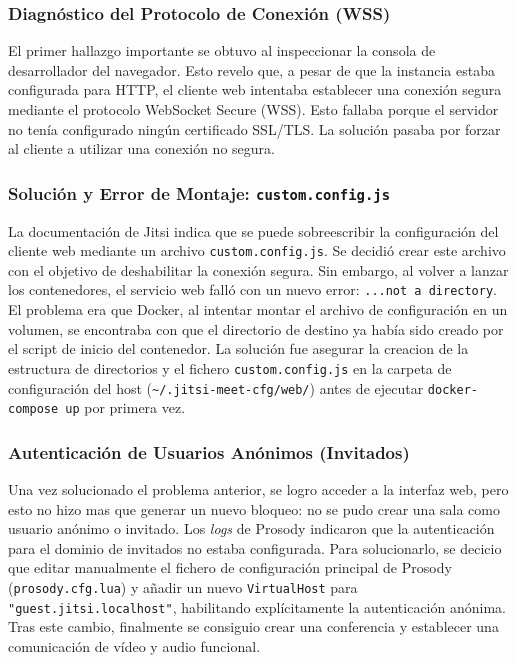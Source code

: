 \subsubsection{Diagnóstico del Protocolo de Conexión (WSS)}
El primer hallazgo importante se obtuvo al inspeccionar la consola de desarrollador del navegador. Esto revelo que, a pesar de que la instancia estaba configurada para HTTP, el cliente web intentaba establecer una conexión segura mediante el protocolo WebSocket Secure (WSS). Esto fallaba porque el servidor no tenía configurado ningún certificado SSL/TLS. La solución pasaba por forzar al cliente a utilizar una conexión no segura.

\subsubsection{Solución y Error de Montaje: \texttt{custom.config.js}}
La documentación de Jitsi indica que se puede sobreescribir la configuración del cliente web mediante un archivo \texttt{custom.config.js}. Se decidió crear este archivo con el objetivo de deshabilitar la conexión segura. Sin embargo, al volver a lanzar los contenedores, el servicio web falló con un nuevo error: \texttt{...not a directory}. El problema era que Docker, al intentar montar el archivo de configuración en un volumen, se encontraba con que el directorio de destino ya había sido creado por el script de inicio del contenedor. La solución fue asegurar la creacion de la estructura de directorios y el fichero \texttt{custom.config.js} en la carpeta de configuración del host (\texttt{\textasciitilde{}/.jitsi-meet-cfg/web/}) antes de ejecutar \texttt{docker-compose up} por primera vez.

\subsubsection{Autenticación de Usuarios Anónimos (Invitados)}
Una vez solucionado el problema anterior, se logro acceder a la interfaz web, pero esto no hizo mas que generar un nuevo bloqueo: no se pudo crear una sala como usuario anónimo o invitado. Los \textit{logs} de Prosody indicaron que la autenticación para el dominio de invitados no estaba configurada. Para solucionarlo, se decicio que editar manualmente el fichero de configuración principal de Prosody (\texttt{prosody.cfg.lua}) y añadir un nuevo \texttt{VirtualHost} para \texttt{"guest.jitsi.localhost"}, habilitando explícitamente la autenticación anónima. Tras este cambio, finalmente se consiguio crear una conferencia y establecer una comunicación de vídeo y audio funcional.

